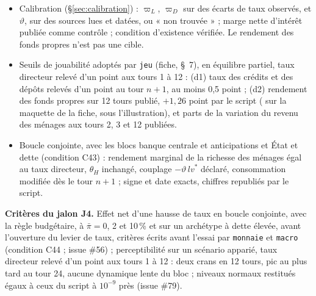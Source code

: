 \documentclass[11pt,a4paper]{article}
\newcommand{\barre}[1]{\leavevmode\sbox{\boitebarre}{#1}\rlap{\rule[0.6ex]{\wd\boitebarre}{0.4pt}}\usebox{\boitebarre}}
\begin{document}
\begin{proposee}
\begin{itemize}
\item Calibration (\S\ref{sec:calibration}) : $\varpi_L$, $\varpi_D$ sur des écarts de taux observés, et $\vartheta$, sur des sources lues et datées, ou « non trouvée » ; marge nette d'intérêt publiée comme contrôle ; condition d'existence vérifiée. Le rendement des fonds propres n'est pas une cible.
\item Seuils de jouabilité adoptés par \texttt{jeu} (fiche, \S~7), en équilibre partiel, taux directeur relevé d'un point aux tours 1 à 12 : (d1) taux des crédits et des dépôts relevés d'un point au tour $n + 1$, au moins 0,5 point ; (d2) rendement des fonds propres sur 12 tours publié, $+1{,}26$ point par le script (\barre{$+1{,}33$} sur la maquette de la fiche, sous l'illustration), et parts de la variation du revenu des ménages aux tours 2, 3 et 12 publiées.
\item Boucle conjointe, avec les blocs banque centrale et anticipations et État et dette (condition C43) : rendement marginal de la richesse des ménages égal au taux directeur, $\theta_H$ inchangé, couplage $-\vartheta\,\mathit{lv}^\ast$ déclaré, consommation modifiée dès le tour $n + 1$ ; signe et date exacts, chiffres republiés par le script.
\end{itemize}

\textbf{Critères du jalon J4.} Effet net d'une hausse de taux en boucle conjointe, avec la règle budgétaire, à $\bar\pi = 0$, 2 et 10\,\% et sur un archétype à dette élevée, avant l'ouverture du levier de taux, critères écrits avant l'essai par \texttt{monnaie} et \texttt{macro} (condition C44 ; issue \#56) ; perceptibilité sur un scénario apparié, taux directeur relevé d'un point aux tours 1 à 12 : deux crans en 12 tours, pic au plus tard au tour 24, aucune dynamique lente du bloc ; niveaux normaux restitués égaux à ceux du script à $10^{-9}$ près (issue \#79).


\end{proposee}
\end{document}
